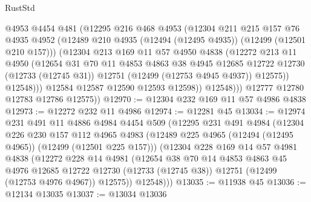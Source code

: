 \begin{lexlean}{RustStd}
\begin{coremodule}
                  @4953
                  @4454
                  @481
                  (@12295
                    @216
                    @468
                    @4953
                    (@12304
                      @211
                      @215
                      @157
                      @76
                      @4935
                      @4952
                      (@12489 @210 @4935 (@12494 (@12495 @4935)) (@12499 (@12501 @210 @157)))
                      (@12304
                        @213
                        @169
                        @11
                        @57
                        @4950
                        @4838
                        (@12272
                          @213
                          @11
                          @4950
                          (@12654
                            @31
                            @70
                            @11
                            @4853
                            @4863
                            @38
                            @4945
                            @12685
                            @12722
                            @12730
                            (@12733 (@12745 @31))
                            @12751
                            (@12499 (@12753 @4945 @4937))
                            @12575))
                        @12548)))
                  @12584
                  @12587
                  @12590
                  @12593
                  @12598))
              @12548)))
        @12777
        @12780
        @12783
        @12786
        @12575))
@12970 := @12304 @232 @169 @11 @57 @4986 @4838
@12973 := @12272 @232 @11 @4986
@12974 := @12281 @45
@13034 := @12974
    @231
    @491
    @11
    @4886
    @4984
    @4454
    @509
    (@12295
      @231
      @491
      @4984
      (@12304
        @226
        @230
        @157
        @112
        @4965
        @4983
        (@12489 @225 @4965 (@12494 (@12495 @4965)) (@12499 (@12501 @225 @157)))
        (@12304
          @228
          @169
          @14
          @57
          @4981
          @4838
          (@12272
            @228
            @14
            @4981
            (@12654
              @38
              @70
              @14
              @4853
              @4863
              @45
              @4976
              @12685
              @12722
              @12730
              (@12733 (@12745 @38))
              @12751
              (@12499 (@12753 @4976 @4967))
              @12575))
          @12548)))
@13035 := @11938 @45
@13036 := @12134 @13035
@13037 := @13034 @13036

\end{coremodule}
\end{lexlean}
